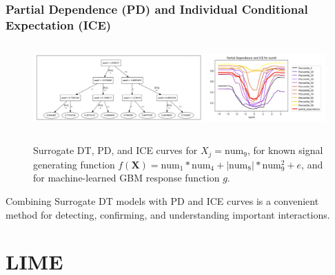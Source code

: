 \documentclass[11pt,
               aspectratio=169
               ]{beamer}
\begin{document}
		\begin{frame}[t]
	
			\frametitle{Partial Dependence (PD) and Individual Conditional Expectation (ICE)}
			
			\vspace{-20pt}
				
				\begin{figure}[htb]
					\begin{center}
						\label{fig:dt_surrogate_pdp_ice}
						\includegraphics[height=95pt]{img/dt_surrogate2_pdp_ice2.png}
						\caption{Surrogate DT, PD, and ICE curves for $ X_j = \text{num}_9$, for known signal generating function $f(\mathbf{X}) = \text{num} _1 * \text{num}_4 + |\text{num}_8| * \text{num}_9^2 + e$, and for machine-learned GBM response function $g$.}
					\end{center}
				\end{figure}
			
				Combining Surrogate DT models with PD and ICE curves is a convenient method for detecting, confirming, and understanding important interactions. 
	
		\end{frame}

	\section{LIME}
\end{document}
